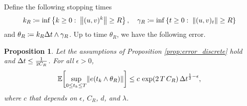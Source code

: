 \documentclass[11pt, twoside]{report}
\newtheorem{proposition}[theorem]{Proposition}
\begin{document}
Define the following stopping times
\begin{align}\label{st}
    k_R \coloneq \inf\left\{k\geq 0:\; \left\lVert( u, v)^k\right\rVert \geq R\right\}, \quad \gamma_R \coloneq \inf\left\{t\geq 0:\; \left\lVert(u,v)_t\right\rVert \geq R\right\}
\end{align}
and $\theta_R \coloneq k_R {\Delta t} \wedge \gamma_R$.
%
Up to time $\theta_R$, we have the following error.

\begin{proposition}\label{prop:error_under_bounded_ball}
  Let the assumptions of Proposition \ref{prop:error_discrete} hold and ${\Delta t} \leq \frac{1}{2C_R}$.  
    For all $\epsilon>0$, 
    \begin{equation}
        \EE\bp{\sup_{0\leq t_k\leq T} \norm{e(t_k\wedge \theta_R)}} \leq  c  \,\exp(2\,T\, C_R)\, \deltat^{\frac12-\epsilon},
    \end{equation}
    where $c$ that depends on $\epsilon$, $C_R$, $d$, and $\lambda$.
\end{proposition}
\end{document}
